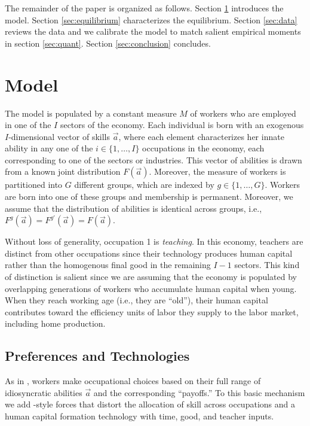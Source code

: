 \documentclass[onehalfspacing,11pt]{article}
\begin{document}
	
	The remainder of the paper is organized as follows. Section \ref{sec:model} introduces the model. Section \ref{sec:equilibrium} characterizes the equilibrium. Section \ref{sec:data} reviews the data and we calibrate the model to match salient empirical moments in section \ref{sec:quant}. Section \ref{sec:conclusion} concludes.
	
	\section{Model}\label{sec:model}
	The model is populated by a constant measure $M$ of workers who are employed in one of the $I$ sectors of the economy. Each individual is born with an exogenous $I$-dimensional vector of skills $\vec{a}$, where each element characterizes her innate ability in any one of the $i \in \{1,\ldots,I\}$ occupations in the economy, each corresponding to one of the sectors or industries. This vector of abilities is drawn from a known joint distribution $F(\vec{a})$. Moreover, the measure of workers is partitioned into $G$ different groups, which are indexed by $g \in \{1,\dots,G \}$. Workers are born into one of these groups and membership is permanent. Moreover, we assume that the distribution of abilities is identical across groups, i.e., $F^g(\vec{a}) = F^{g'}(\vec{a}) = F(\vec{a})$.
	
	Without loss of generality, occupation 1 is \textit{teaching}. In this economy, teachers are distinct from other occupations since their technology produces human capital rather than the homogenous final good in the remaining $I-1$ sectors. This kind of distinction is salient since we are assuming that the economy is populated by overlapping generations of workers who accumulate human capital when young. When they reach working age (i.e., they are ``old''), their human capital contributes toward the efficiency units of labor they supply to the labor market, including home production.
	\subsection{Preferences and Technologies}\label{sec:workers}
	As in \cite{Roy:1951}, workers make occupational choices based on their full range of idiosyncratic abilities $\vec{a}$ and the corresponding ``payoffs.'' To this basic mechanism we add \cite{Hsieh:2019}-style forces that distort the allocation of skill across occupations and a human capital formation technology with time, good, and teacher inputs.
	
\end{document}

